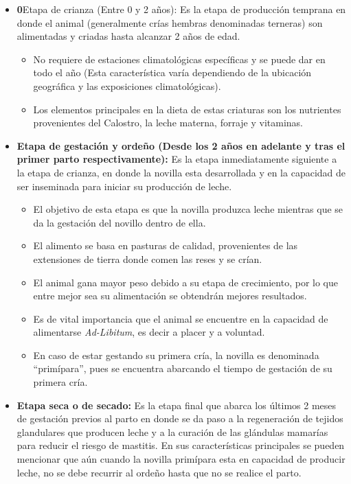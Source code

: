 \begin{itemize}
    \item \textbf0{Etapa de crianza (Entre 0 y 2 años):} Es la etapa de producción temprana en donde el animal (generalmente crías hembras denominadas terneras) son alimentadas y criadas hasta alcanzar 2 años de edad.
	\begin{itemize}
		\item No requiere de estaciones climatológicas específicas y se puede dar en todo el año (Esta característica varía dependiendo de la ubicación geográfica y las exposiciones climatológicas).
		\item Los elementos principales en la dieta de estas criaturas son los nutrientes provenientes del Calostro, la leche materna, forraje y vitaminas.
	\end{itemize}
    \item \textbf{Etapa de gestación y ordeño (Desde los 2 años en adelante y tras el primer parto respectivamente):} Es la etapa inmediatamente siguiente a la etapa de crianza, en donde la novilla esta desarrollada y en la capacidad de ser inseminada para iniciar su producción de leche.
	\begin{itemize}
		\item El objetivo de esta etapa es que la novilla produzca leche mientras que se da la gestación del novillo dentro de ella.
		\item El alimento se basa en pasturas de calidad, provenientes de las extensiones de tierra donde comen las reses y se crían.
		\item El animal gana mayor peso debido a su etapa de crecimiento, por lo que entre mejor sea su alimentación se obtendrán mejores resultados.
		\item Es de vital importancia que el animal se encuentre en la capacidad de  alimentarse \textit{Ad-Libitum}, es decir a placer y a voluntad.
		\item En caso de estar gestando su primera cría, la novilla es denominada ``primípara'', pues se encuentra abarcando el tiempo de gestación de su primera cría.
	\end{itemize}
    \item \textbf{Etapa seca o de secado:} Es la etapa final que abarca los últimos 2 meses de gestación previos al parto en donde se da paso a la regeneración de tejidos glandulares que producen leche y a la curación de las glándulas mamarías para reducir el riesgo de mastitis. En sus características principales se pueden mencionar que aún cuando la novilla primípara esta en capacidad de producir leche, no se debe recurrir al ordeño hasta que no se realice el parto.
\end{itemize}

